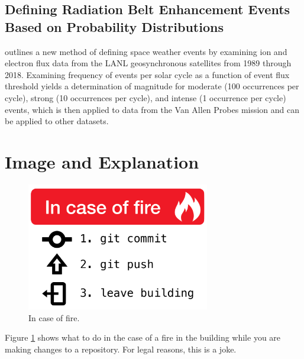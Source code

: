 \documentclass[12pt, letterpaper]{article}
\begin{document}
\subsection{Defining Radiation Belt Enhancement Events Based on Probability Distributions}

\citet[]{Reeves2020} outlines a new method of defining space weather events by examining ion and electron flux data from the LANL geosynchronous satellites from 1989 through 2018. Examining frequency of events per solar cycle as a function of event flux threshold yields a determination of magnitude for moderate (100 occurrences per cycle), strong (10 occurrences per cycle), and intense (1 occurrence per cycle) events, which is then applied to data from the Van Allen Probes mission and can be applied to other datasets.

\section{Image and Explanation}


\begin{figure}[!ht]
  \centering
  \includegraphics[width=8cm]{meme.png}
  \caption{In case of fire.}
  \label{fig:meme}
\end{figure}

Figure \ref{fig:meme} shows what to do in the case of a fire in the building while you are making changes to a repository. For legal reasons, this is a joke.
\end{document}
